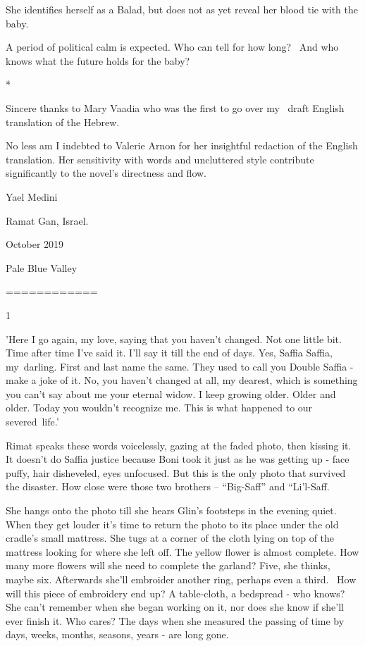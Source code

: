 \documentclass[letterpaper]{article}
\begin{document}
\bigskip

{She identifies herself as a Balad, but does not as yet reveal her
blood tie with the baby.}

{A period of political calm is expected. Who can tell for how long?
\ And who knows what the future holds for the baby? }


\bigskip

*

Sincere thanks to Mary Vaadia who was the first to go over my \ draft English translation of the Hebrew. 


\bigskip

No less am I indebted to Valerie Arnon for her insightful redaction of the English translation. Her sensitivity with
words and uncluttered style contribute significantly to the novel's directness and flow.


\bigskip

Yael Medini

Ramat Gan, Israel.

October 2019 


\bigskip

\clearpage
Pale Blue Valley

============


\bigskip


\bigskip

{1}

{{}'Here I go }again, my
love,{ saying that you haven't changed. Not one little
bit}{. }{Time after time I've said it. I'll say it till
the end of days. Yes, Saffia Saffia, my~darling. First and last name the same. }They used to call you Double Saffia -
make a joke of it.{ No,
you}\textit{{
}}{haven't changed }at all,
{my dearest, }which is something you
{can't say about me your
}eternal{ widow. I keep growing older. Older and older.
}Today{ you wouldn't recognize me. This is what happened to our
severed~life.'}

Rimat speaks these words voicelessly, gazing at the faded photo, then kissing it.
It{ doesn't do Saffia}{
}{justice because Boni took it }just as he was getting up - face
puffy, hair disheveled,{
}{eyes unfocused. But this is the only photo that survived }the
disaster{. How close were those two brothers -- }{}``Big-Saff'' and
``Li'l-Saff{\textquotedbl}. 

S{he hangs onto the photo till she hears Glin's footsteps in the
evening quiet. When }they get louder {it's time to return the photo to
its place under the old cradle's }small{ mattress. She tugs at a
corner of the}{ }cloth lying on top of the
mattress{ looking for where she left off. The yellow flower is almost
complete. How many more flowers will she need} {to complete the
garland? Five, she }thinks{, maybe six. Afterwards she'll embroider
another }ring, p{erhaps even a third.~
}How{ will this piece of embroidery end
}up?{ }A{
table-cloth,} a {bedspread - who knows? She can't remember when she
began working on }it, nor does she know if she'll {ever finish it. Who
cares? }The days when she measured the passing of time by days, weeks, months, seasons, years - are long gone. 
\end{document}
